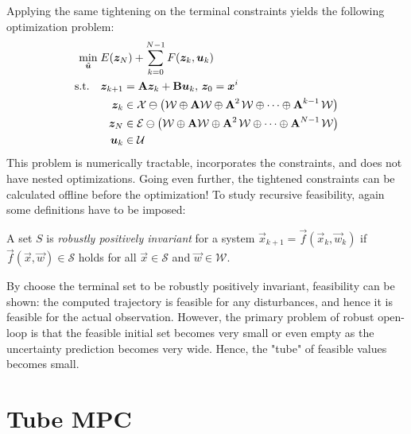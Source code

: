 		Applying the same tightening on the terminal constraints yields the following optimization problem:
		\begin{equation}
			\begin{aligned}
				\min_{\tilde{\bm{u}}}\; & E(\bm{z}_N) + \sum_{k = 0}^{N - 1} F(\bm{z}_k, \bm{u}_k) \\
				\text{s.t.}\quad         &
				\begin{aligned}[t]
					\bm{z}_{k + 1} & = \bm{\mathrm{A}} \bm{z}_k + \bm{\mathrm{B}} \bm{u}_k,\, \bm{z}_0 = \bm{x}^i                                                                                                 \\
					\bm{z}_k       & \in \mathcal{X} \ominus \bigl( \mathcal{W} \oplus \bm{\mathrm{A}} \mathcal{W} \oplus \bm{\mathrm{A}}^{2\,} \mathcal{W} \oplus \cdots \oplus \bm{\mathrm{A}}^{k - 1\,} \mathcal{W} \bigr) \\
					\bm{z}_N       & \in \mathcal{E} \ominus \bigl( \mathcal{W} \oplus \bm{\mathrm{A}} \mathcal{W} \oplus \bm{\mathrm{A}}^{2\,} \mathcal{W} \oplus \cdots \oplus \bm{\mathrm{A}}^{N - 1\,} \mathcal{W} \bigr) \\
					\bm{u}_k       & \in \mathcal{U}
				\end{aligned}
			\end{aligned}
		\end{equation}
		This problem is numerically tractable, incorporates the constraints, and does not have nested optimizations. Going even further, the tightened constraints can be calculated offline before the optimization! To study recursive feasibility, again some definitions have to be imposed:
		\begin{definition}
			A set \(S\) is \emph{robustly positively invariant} for a system \( \vec{x}_{k + 1} = \vec{f}(\vec{x}_k, \vec{w}_k) \) if \( \vec{f}(\vec{x}, \vec{w}) \in \mathcal{S} \) holds for all \( \vec{x} \in \mathcal{S} \) and \( \vec{w} \in \mathcal{W} \).
		\end{definition}
		By choose the terminal set to be robustly positively invariant, feasibility can be shown: the computed trajectory is feasible for any disturbances, and hence it is feasible for the actual observation. However, the primary problem of robust open-loop is that the feasible initial set becomes very small or even empty as the uncertainty prediction becomes very wide. Hence, the "tube" of feasible values becomes small.

	\section{Tube MPC}
		\label{sec:tubeMpc}

